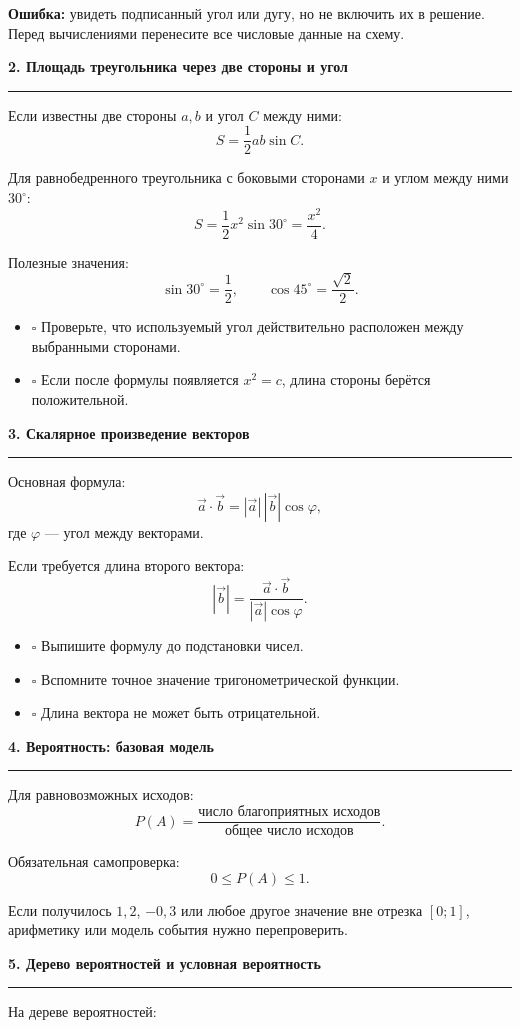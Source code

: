 \documentclass[a4paper,12pt]{article}
\newcommand{\topic}[1]{%
  \Needspace{8\baselineskip}%
  \vspace{0.6em}
  {\Large\bfseries\color{darkaccent}#1}\par
  \vspace{0.25em}
  {\color{accent}\rule{\linewidth}{0.6pt}}\par
  \vspace{0.3em}
}
\newcommand{\mistake}[1]{\textbf{\color{warn}Ошибка:} #1}
\newcommand{\checkitem}{\(\square\)}
\begin{document}
\mistake{увидеть подписанный угол или дугу, но не включить их в решение. Перед вычислениями перенесите все числовые данные на схему.}

\topic{2. Площадь треугольника через две стороны и угол}

Если известны две стороны \(a,b\) и угол \(C\) между ними:
\[
S=\frac12 ab\sin C.
\]

Для равнобедренного треугольника с боковыми сторонами \(x\) и углом между ними \(30^\circ\):
\[
S=\frac12 x^2\sin30^\circ=\frac{x^2}{4}.
\]

Полезные значения:
\[
\sin30^\circ=\frac12,\qquad
\cos45^\circ=\frac{\sqrt2}{2}.
\]

\begin{itemize}
  \item \checkitem{} Проверьте, что используемый угол действительно расположен между выбранными сторонами.
  \item \checkitem{} Если после формулы появляется \(x^2=c\), длина стороны берётся положительной.
\end{itemize}

\topic{3. Скалярное произведение векторов}

Основная формула:
\[
\vec a\cdot\vec b=|\vec a|\,|\vec b|\cos\varphi,
\]
где \(\varphi\) --- угол между векторами.

Если требуется длина второго вектора:
\[
|\vec b|=\frac{\vec a\cdot\vec b}{|\vec a|\cos\varphi}.
\]

\begin{itemize}
  \item \checkitem{} Выпишите формулу до подстановки чисел.
  \item \checkitem{} Вспомните точное значение тригонометрической функции.
  \item \checkitem{} Длина вектора не может быть отрицательной.
\end{itemize}

\topic{4. Вероятность: базовая модель}

Для равновозможных исходов:
\[
P(A)=\frac{\text{число благоприятных исходов}}{\text{общее число исходов}}.
\]

Обязательная самопроверка:
\[
0\le P(A)\le1.
\]

Если получилось \(1{,}2\), \(-0{,}3\) или любое другое значение вне отрезка \([0;1]\),
арифметику или модель события нужно перепроверить.

\topic{5. Дерево вероятностей и условная вероятность}

На дереве вероятностей:
\end{document}
